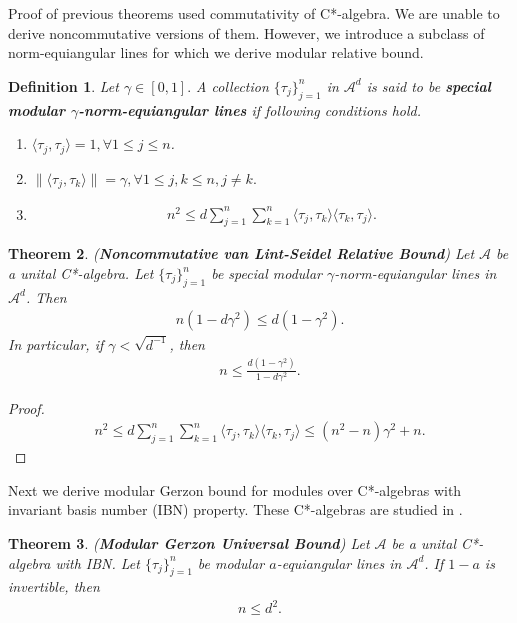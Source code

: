 \documentclass{amsart}
\newtheorem{theorem}{Theorem}[section]
\newtheorem{definition}[theorem]{Definition}
\begin{document}
Proof of previous theorems used commutativity of C*-algebra. We are unable to derive noncommutative versions of them. However,  we introduce a subclass of norm-equiangular lines for which we derive modular relative bound.
\begin{definition}
	Let $\gamma\in [0,1].$   A collection $\{\tau_j\}_{j=1}^n$ in  $\mathcal{A}^d$  is said to be \textbf{special modular $\gamma$-norm-equiangular  lines} if following conditions hold.
	\begin{enumerate}[\upshape(i)]
		\item $	\langle \tau_j, \tau_j \rangle =1,  \forall 1\leq j \leq n$.
		\item $	\|\langle\tau_j, \tau_k \rangle\|=\gamma,  \forall 	1\leq j , k \leq n , j\neq k.$
		\item 
		\begin{align*}
			n^2 \leq d \sum_{j=1}^n\sum_{k=1}^n\langle \tau_j, \tau_k\rangle \langle \tau_k, \tau_j\rangle.
		\end{align*}
	\end{enumerate}
\end{definition}
\begin{theorem} (\textbf{Noncommutative van Lint-Seidel Relative Bound})
Let $\mathcal{A}$ be a  unital C*-algebra.	Let $\{\tau_j\}_{j=1}^n$  	be special modular  $\gamma$-norm-equiangular  lines in $\mathcal{A}^d$. Then 
\begin{align*}
	n(1-d\gamma^2) \leq d(1-\gamma^2).
\end{align*}
In particular, if $\gamma<\sqrt{d^{-1}}$, then 
\begin{align*}
	n\leq \frac{d(1-\gamma^2)}{1-d\gamma^2}.
\end{align*}
\end{theorem}
\begin{proof}
\begin{align*}
	n^2 \leq d \sum_{j=1}^n\sum_{k=1}^n\langle \tau_j, \tau_k\rangle \langle \tau_k, \tau_j\rangle\leq (n^2-n)\gamma^2+n.
\end{align*}	
\end{proof}
Next we derive modular Gerzon bound for modules over C*-algebras with invariant basis number  (IBN) property. These C*-algebras are studied in \cite{GIPSON}.
\begin{theorem} (\textbf{Modular Gerzon Universal Bound}) 
Let $\mathcal{A}$ be a  unital C*-algebra with IBN. Let $\{\tau_j\}_{j=1}^n$  	be  modular $a$-equiangular  lines in $\mathcal{A}^d$. If $1-a$ is invertible, then
		\begin{align}\label{MG}
			n \leq d^2.
		\end{align}	
\end{theorem}
\end{document}
